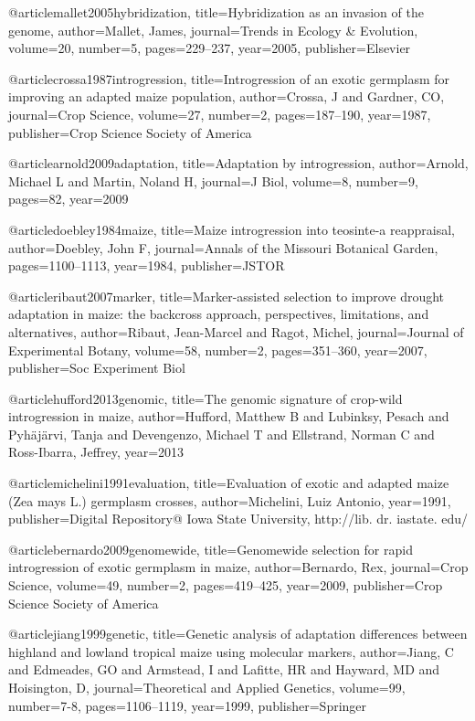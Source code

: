 @article{mallet2005hybridization,
  title={Hybridization as an invasion of the genome},
  author={Mallet, James},
  journal={Trends in Ecology \& Evolution},
  volume={20},
  number={5},
  pages={229--237},
  year={2005},
  publisher={Elsevier}
}

@article{crossa1987introgression,
  title={Introgression of an exotic germplasm for improving an adapted maize population},
  author={Crossa, J and Gardner, CO},
  journal={Crop Science},
  volume={27},
  number={2},
  pages={187--190},
  year={1987},
  publisher={Crop Science Society of America}
}

@article{arnold2009adaptation,
  title={Adaptation by introgression},
  author={Arnold, Michael L and Martin, Noland H},
  journal={J Biol},
  volume={8},
  number={9},
  pages={82},
  year={2009}
}

@article{doebley1984maize,
  title={Maize introgression into teosinte-a reappraisal},
  author={Doebley, John F},
  journal={Annals of the Missouri Botanical Garden},
  pages={1100--1113},
  year={1984},
  publisher={JSTOR}
}

@article{ribaut2007marker,
  title={Marker-assisted selection to improve drought adaptation in maize: the backcross approach, perspectives, limitations, and alternatives},
  author={Ribaut, Jean-Marcel and Ragot, Michel},
  journal={Journal of Experimental Botany},
  volume={58},
  number={2},
  pages={351--360},
  year={2007},
  publisher={Soc Experiment Biol}
}

@article{hufford2013genomic,
  title={The genomic signature of crop-wild introgression in maize},
  author={Hufford, Matthew B and Lubinksy, Pesach and Pyh{\"a}j{\"a}rvi, Tanja and Devengenzo, Michael T and Ellstrand, Norman C and Ross-Ibarra, Jeffrey},
  year={2013}
}

@article{michelini1991evaluation,
  title={Evaluation of exotic and adapted maize (Zea mays L.) germplasm crosses},
  author={Michelini, Luiz Antonio},
  year={1991},
  publisher={Digital Repository@ Iowa State University, http://lib. dr. iastate. edu/}
}

@article{bernardo2009genomewide,
  title={Genomewide selection for rapid introgression of exotic germplasm in maize},
  author={Bernardo, Rex},
  journal={Crop Science},
  volume={49},
  number={2},
  pages={419--425},
  year={2009},
  publisher={Crop Science Society of America}
}

@article{jiang1999genetic,
  title={Genetic analysis of adaptation differences between highland and lowland tropical maize using molecular markers},
  author={Jiang, C and Edmeades, GO and Armstead, I and Lafitte, HR and Hayward, MD and Hoisington, D},
  journal={Theoretical and Applied Genetics},
  volume={99},
  number={7-8},
  pages={1106--1119},
  year={1999},
  publisher={Springer}
}

